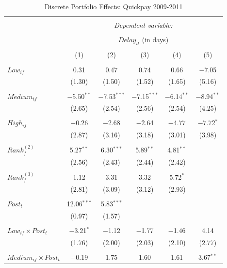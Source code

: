 \documentclass[
]{article}
\begin{document}
\begin{table}[H] \centering 
  \caption{Discrete Portfolio Effects: Quickpay 2009-2011} 
  \label{} 
\small 
\begin{tabular}{@{\extracolsep{-2pt}}lccccc} 
\\[-1.8ex]\hline 
\hline \\[-1.8ex] 
 & \multicolumn{5}{c}{\textit{Dependent variable:}} \\ 
\cline{2-6} 
\\[-1.8ex] & \multicolumn{5}{c}{$Delay_{it}$ (in days)} \\ 
\\[-1.8ex] & (1) & (2) & (3) & (4) & (5)\\ 
\hline \\[-1.8ex] 
 $Low_{if}$ & 0.31 & 0.47 & 0.74 & 0.66 & $-$7.05 \\ 
  & (1.30) & (1.50) & (1.52) & (1.65) & (5.16) \\ 
  & & & & & \\ 
 $Medium_{if}$ & $-$5.50$^{**}$ & $-$7.53$^{***}$ & $-$7.15$^{***}$ & $-$6.14$^{**}$ & $-$8.94$^{**}$ \\ 
  & (2.65) & (2.54) & (2.56) & (2.54) & (4.25) \\ 
  & & & & & \\ 
 $High_{if}$ & $-$0.26 & $-$2.68 & $-$2.64 & $-$4.77 & $-$7.72$^{*}$ \\ 
  & (2.87) & (3.16) & (3.18) & (3.01) & (3.98) \\ 
  & & & & & \\ 
 $Rank_f^{(2)}$ & 5.27$^{**}$ & 6.30$^{***}$ & 5.89$^{**}$ & 4.81$^{**}$ &  \\ 
  & (2.56) & (2.43) & (2.44) & (2.42) &  \\ 
  & & & & & \\ 
 $Rank_f^{(3)}$ & 1.12 & 3.31 & 3.32 & 5.72$^{*}$ &  \\ 
  & (2.81) & (3.09) & (3.12) & (2.93) &  \\ 
  & & & & & \\ 
 $Post_t$ & 12.06$^{***}$ & 5.83$^{***}$ &  &  &  \\ 
  & (0.97) & (1.57) &  &  &  \\ 
  & & & & & \\ 
 $Low_{if} \times Post_t$ & $-$3.21$^{*}$ & $-$1.12 & $-$1.77 & $-$1.46 & 4.14 \\ 
  & (1.76) & (2.00) & (2.03) & (2.10) & (2.77) \\ 
  & & & & & \\ 
 $Medium_{if} \times Post_t$ & $-$0.19 & 1.75 & 1.60 & 1.61 & 3.67$^{**}$ \\ 

\end{tabular}
\end{table}
\end{document}
